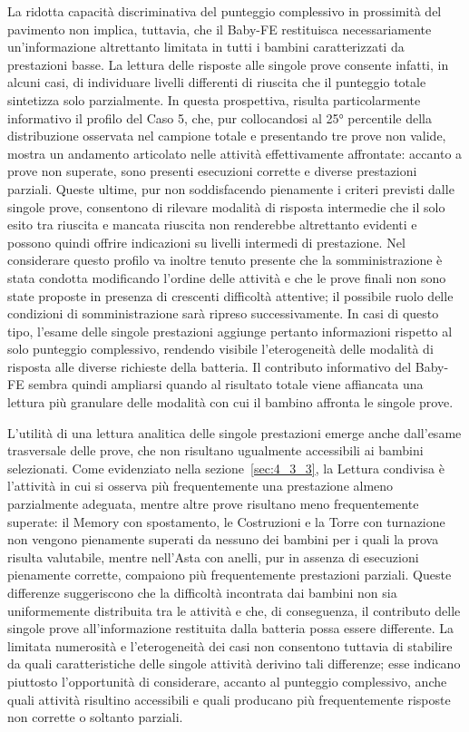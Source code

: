 La ridotta capacità discriminativa del punteggio complessivo in prossimità del pavimento non implica, tuttavia, che il Baby-FE restituisca necessariamente un'informazione altrettanto limitata in tutti i bambini caratterizzati da prestazioni basse. La lettura delle risposte alle singole prove consente infatti, in alcuni casi, di individuare livelli differenti di riuscita che il punteggio totale sintetizza solo parzialmente. In questa prospettiva, risulta particolarmente informativo il profilo del Caso 5, che, pur collocandosi al 25° percentile della distribuzione osservata nel campione totale e presentando tre prove non valide, mostra un andamento articolato nelle attività effettivamente affrontate: accanto a prove non superate, sono presenti esecuzioni corrette e diverse prestazioni parziali. Queste ultime, pur non soddisfacendo pienamente i criteri previsti dalle singole prove, consentono di rilevare modalità di risposta intermedie che il solo esito tra riuscita e mancata riuscita non renderebbe altrettanto evidenti e possono quindi offrire indicazioni su livelli intermedi di prestazione. Nel considerare questo profilo va inoltre tenuto presente che la somministrazione è stata condotta modificando l'ordine delle attività e che le prove finali non sono state proposte in presenza di crescenti difficoltà attentive; il possibile ruolo delle condizioni di somministrazione sarà ripreso successivamente. In casi di questo tipo, l'esame delle singole prestazioni aggiunge pertanto informazioni rispetto al solo punteggio complessivo, rendendo visibile l'eterogeneità delle modalità di risposta alle diverse richieste della batteria. Il contributo informativo del Baby-FE sembra quindi ampliarsi quando al risultato totale viene affiancata una lettura più granulare delle modalità con cui il bambino affronta le singole prove.

L'utilità di una lettura analitica delle singole prestazioni emerge anche dall'esame trasversale delle prove, che non risultano ugualmente accessibili ai bambini selezionati. Come evidenziato nella sezione~\ref{sec:4_3_3}, la Lettura condivisa è l'attività in cui si osserva più frequentemente una prestazione almeno parzialmente adeguata, mentre altre prove risultano meno frequentemente superate: il Memory con spostamento, le Costruzioni e la Torre con turnazione non vengono pienamente superati da nessuno dei bambini per i quali la prova risulta valutabile, mentre nell'Asta con anelli, pur in assenza di esecuzioni pienamente corrette, compaiono più frequentemente prestazioni parziali. Queste differenze suggeriscono che la difficoltà incontrata dai bambini non sia uniformemente distribuita tra le attività e che, di conseguenza, il contributo delle singole prove all'informazione restituita dalla batteria possa essere differente. La limitata numerosità e l'eterogeneità dei casi non consentono tuttavia di stabilire da quali caratteristiche delle singole attività derivino tali differenze; esse indicano piuttosto l'opportunità di considerare, accanto al punteggio complessivo, anche quali attività risultino accessibili e quali producano più frequentemente risposte non corrette o soltanto parziali.

